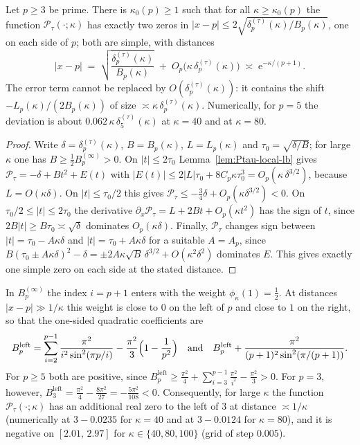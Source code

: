 \begin{corollary}\label{cor:Ptau-flank}
Let $p\ge3$ be prime. There is $\kappa_0(p)\ge1$ such that for all $\kappa\ge \kappa_0(p)$ the function $\mathcal P_\tau(\cdot;\kappa)$ has exactly two zeros in $|x-p|\le 2\sqrt{\delta_p^{(\tau)}(\kappa)/B_p(\kappa)}$, one on each side of $p$; both are simple, with distances
\[
|x-p|\;=\;\sqrt{\frac{\delta_p^{(\tau)}(\kappa)}{B_p(\kappa)}}\;+\;O_p\bigl(\kappa\,\delta_p^{(\tau)}(\kappa)\bigr)
\;\asymp\; \mathrm e^{-\kappa/(p+1)}.
\]
The error term cannot be replaced by $O(\delta_p^{(\tau)}(\kappa))$: it contains the shift $-L_p(\kappa)/(2B_p(\kappa))$ of size $\asymp\kappa\,\delta_p^{(\tau)}(\kappa)$. Numerically, for $p=5$ the deviation is about $0.062\,\kappa\,\delta_5^{(\tau)}(\kappa)$ at $\kappa=40$ and at $\kappa=80$.
\end{corollary}
\begin{proof}
Write $\delta=\delta_p^{(\tau)}(\kappa)$, $B=B_p(\kappa)$, $L=L_p(\kappa)$ and $\tau_0=\sqrt{\delta/B}$; for large $\kappa$ one has $B\ge\frac12B_p^{(\infty)}>0$. On $|t|\le2\tau_0$ Lemma~\ref{lem:Ptau-local-lb} gives $\mathcal P_\tau=-\delta+Bt^2+E(t)$ with $|E(t)|\le 2|L|\tau_0+8C_p\kappa\tau_0^3=O_p(\kappa\,\delta^{3/2})$, because $L=O(\kappa\delta)$. On $|t|\le\tau_0/2$ this gives $\mathcal P_\tau\le-\frac34\delta+O_p(\kappa\delta^{3/2})<0$. On $\tau_0/2\le|t|\le2\tau_0$ the derivative $\partial_x\mathcal P_\tau=L+2Bt+O_p(\kappa t^2)$ has the sign of $t$, since $2B|t|\ge B\tau_0\asymp\sqrt\delta$ dominates $O_p(\kappa\delta)$. Finally, $\mathcal P_\tau$ changes sign between $|t|=\tau_0-A\kappa\delta$ and $|t|=\tau_0+A\kappa\delta$ for a suitable $A=A_p$, since $B(\tau_0\pm A\kappa\delta)^2-\delta=\pm2A\kappa\sqrt{B}\,\delta^{3/2}+O(\kappa^2\delta^2)$ dominates $E$. This gives exactly one simple zero on each side at the stated distance.
\end{proof}

\begin{remark}[The prime $p=3$]\label{rem:Ptau-p3}
In $B_p^{(\infty)}$ the index $i=p+1$ enters with the weight $\phi_\kappa(1)=\frac12$. At distances $|x-p|\gg1/\kappa$ this weight is close to $0$ on the left of $p$ and close to $1$ on the right, so that the one-sided quadratic coefficients are
\[
B_p^{\mathrm{left}}=\sum_{i=2}^{p-1}\frac{\pi^2}{i^2\sin^2(\pi p/i)}-\frac{\pi^2}{3}\Bigl(1-\frac1{p^2}\Bigr)
\quad\text{and}\quad
B_p^{\mathrm{left}}+\frac{\pi^2}{(p+1)^2\sin^2(\pi/(p+1))}.
\]
For $p\ge5$ both are positive, since $B_p^{\mathrm{left}}\ge\frac{\pi^2}{4}+\sum_{i=3}^{p-1}\frac{\pi^2}{i^2}-\frac{\pi^2}{3}>0$. For $p=3$, however, $B_3^{\mathrm{left}}=\frac{\pi^2}{4}-\frac{8\pi^2}{27}=-\frac{5\pi^2}{108}<0$. Consequently, for large $\kappa$ the function $\mathcal P_\tau(\cdot;\kappa)$ has an additional real zero to the left of $3$ at distance $\asymp1/\kappa$ (numerically at $3-0.0235$ for $\kappa=40$ and at $3-0.0124$ for $\kappa=80$), and it is negative on $[2.01,\,2.97]$ for $\kappa\in\{40,80,100\}$ (grid of step $0.005$).
\end{remark}



